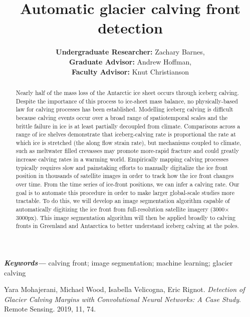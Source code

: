 \documentclass[a4paper]{article}
\title{Automatic glacier calving front detection}
\author{\textbf{Undergraduate Researcher:}
Zachary Barnes, \\ \textbf{Graduate Advisor:} Andrew Hoffman,\\ \textbf{Faculty Advisor:} Knut Christianson  \\
}
\providecommand{\keywords}[1]
{
  \small	
  \textbf{\textit{Keywords---}} #1
}
\begin{document}
\maketitle

\begin{abstract} 
Nearly half of the mass loss of the Antarctic ice sheet occurs through iceberg calving. Despite the importance of this process to ice-sheet mass balance, no physically-based law for calving processes has been established. Modelling iceberg calving is difficult because calving events occur over a broad range of spatiotemporal scales and the brittle failure in ice is at least partially decoupled from climate. Comparisons across a range of ice shelves demonstrate that iceberg-calving rate is proportional the rate at which ice is stretched (the along flow strain rate), but mechanisms coupled to climate, such as meltwater filled crevasses may promote more-rapid fracture and could greatly increase calving rates in a warming world. Empirically mapping calving processes typically requires slow and painstaking efforts to manually digitalize the ice front position in thousands of satellite images in order to track how the ice front changes over time. From the time series of ice-front positions, we can infer a calving rate. Our goal is to automate this procedure in order to make larger global-scale studies more tractable. To do this, we will develop an image segmentation algorithm capable of automatically digitizing the ice front from full-resolution satellite imagery (3000$\times$3000px). This image segmentation algorithm will then be applied broadly to calving fronts in Greenland and Antarctica to better understand iceberg calving at the poles.
\end{abstract} \hspace{10pt}

\keywords{calving front; image segmentation; machine learning;  glacier calving}

\begin{thebibliography}{00}
 Yara Mohajerani, Michael Wood, Isabella Velicogna, Eric Rignot. \textit{Detection of Glacier Calving Margins with Convolutional Neural Networks: A Case Study}. Remote Sensing. 2019, 11, 74.

\end{thebibliography}


%
\end{document}
